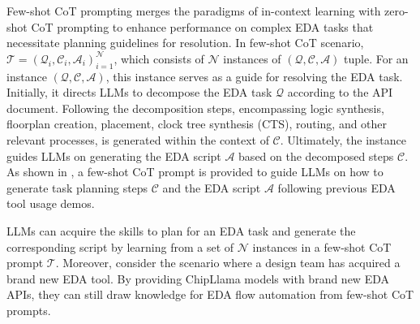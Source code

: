 Few-shot CoT prompting merges the paradigms of in-context learning with zero-shot CoT prompting to enhance performance on complex EDA tasks that necessitate planning guidelines for resolution. 
In few-shot CoT scenario, $\mathcal{T} = {(\mathcal{Q}_{i}, \mathcal{C}_{i}, \mathcal{A}_{i})}^{\mathcal{N}}_{i=1}$, which consists of $\mathcal{N}$ instances of $(\mathcal{Q}, \mathcal{C}, \mathcal{A})$ tuple. 
For an instance $(\mathcal{Q}, \mathcal{C}, \mathcal{A})$, this instance serves as a guide for resolving the EDA task.
Initially, it directs LLMs to decompose the EDA task $\mathcal{Q}$ according to the API document.
Following the decomposition steps, encompassing logic synthesis, floorplan creation, placement, clock tree synthesis (CTS), routing, and other relevant processes, is generated within the context of $\mathcal{C}$.
Ultimately, the instance guides LLMs on generating the EDA script $\mathcal{A}$ based on the decomposed steps $\mathcal{C}$.
As shown in , a few-shot CoT prompt is provided to guide LLMs on how to generate task planning steps $\mathcal{C}$ and the EDA script $\mathcal{A}$ following previous EDA tool usage demos.

LLMs can acquire the skills to plan for an EDA task and generate the corresponding script by learning from a set of $\mathcal{N}$ instances in a few-shot CoT prompt $\mathcal{T}$. 
Moreover, consider the scenario where a design team has acquired a brand new EDA tool.
By providing ChipLlama models with brand new EDA APIs, they can still draw knowledge for EDA flow automation from few-shot CoT prompts.
